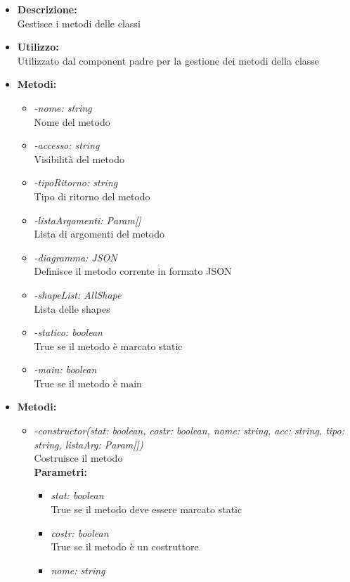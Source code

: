 \begin{itemize}
	\item \textbf{Descrizione:}\\
	Gestisce i metodi delle classi
	\item \textbf{Utilizzo:}\\
	Utilizzato dal component padre per la gestione dei metodi della classe
	\item \textbf{Metodi:}
		\begin{itemize}
			\item \emph{-nome: string}\\
    		Nome del metodo
    		\item \emph{-accesso: string}\\
    		Visibilità del metodo
    		\item \emph{-tipoRitorno: string}\\
    		Tipo di ritorno del metodo
    		\item \emph{-listaArgomenti: Param[]}\\
    		Lista di argomenti del metodo
    		\item \emph{-diagramma: JSON}\\
    		Definisce il metodo corrente in formato JSON
    		\item \emph{-shapeList: AllShape}\\
    		Lista delle shapes
    		\item \emph{-statico: boolean}\\
    		True se il metodo è marcato static
    		\item \emph{-main: boolean}\\
    		True se il metodo è main
		\end{itemize}
	\item \textbf{Metodi:}
		\begin{itemize}
			\item \emph{-constructor(stat: boolean, costr: boolean, nome: string, acc: string, tipo: string, listaArg: Param[])}\\
    		Costruisce il metodo\\
    		\textbf{Parametri:}
    		\begin{itemize}
    			\item \emph{stat: boolean}\\
    			True se il metodo deve essere marcato static
    			\item \emph{costr: boolean}\\
    			True se il metodo è un costruttore
    			\item \emph{nome: string}\\

\end{itemize}
\end{itemize}
\end{itemize}
